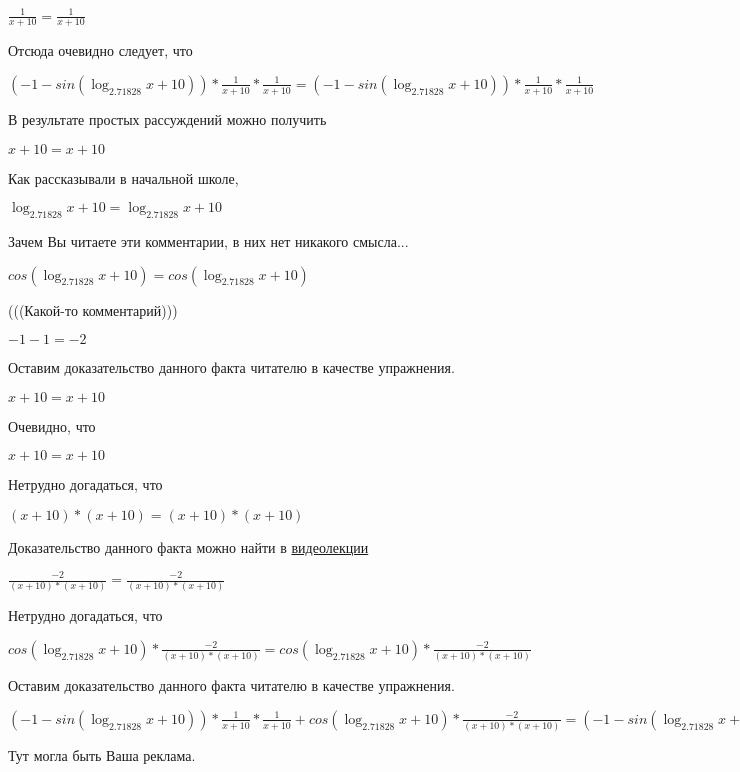 \documentclass[12pt,a4paper,fleqn]{article}
\theoremstyle{definition}
\begin{document}
$\frac{ 1 }{ x  +  10 }
 = \frac{ 1 }{ x  +  10 }
$

Отсюда очевидно следует, что

$( -1  - sin(\log_{ 2.71828 }{ x  +  10 })) * \frac{ 1 }{ x  +  10 }
 * \frac{ 1 }{ x  +  10 }
 = ( -1  - sin(\log_{ 2.71828 }{ x  +  10 })) * \frac{ 1 }{ x  +  10 }
 * \frac{ 1 }{ x  +  10 }
$

В результате простых рассуждений можно получить

$ x  +  10  =  x  +  10 $

Как рассказывали в начальной школе,

$\log_{ 2.71828 }{ x  +  10 } = \log_{ 2.71828 }{ x  +  10 }$

Зачем Вы читаете эти комментарии, в них нет никакого смысла...

$cos(\log_{ 2.71828 }{ x  +  10 }) = cos(\log_{ 2.71828 }{ x  +  10 })$

(((Какой-то комментарий)))

$ -1  -  1  =  -2 $

Оставим доказательство данного факта читателю в качестве упражнения.

$ x  +  10  =  x  +  10 $

Очевидно, что

$ x  +  10  =  x  +  10 $

Нетрудно догадаться, что

$( x  +  10 ) * ( x  +  10 ) = ( x  +  10 ) * ( x  +  10 )$

Доказательство данного факта можно найти в \href{https://www.youtube.com/watch?v=dQw4w9WgXcQ}{видеолекции}

$\frac{ -2 }{( x  +  10 ) * ( x  +  10 )}
 = \frac{ -2 }{( x  +  10 ) * ( x  +  10 )}
$

Нетрудно догадаться, что

$cos(\log_{ 2.71828 }{ x  +  10 }) * \frac{ -2 }{( x  +  10 ) * ( x  +  10 )}
 = cos(\log_{ 2.71828 }{ x  +  10 }) * \frac{ -2 }{( x  +  10 ) * ( x  +  10 )}
$

Оставим доказательство данного факта читателю в качестве упражнения.

$( -1  - sin(\log_{ 2.71828 }{ x  +  10 })) * \frac{ 1 }{ x  +  10 }
 * \frac{ 1 }{ x  +  10 }
 + cos(\log_{ 2.71828 }{ x  +  10 }) * \frac{ -2 }{( x  +  10 ) * ( x  +  10 )}
 = ( -1  - sin(\log_{ 2.71828 }{ x  +  10 })) * \frac{ 1 }{ x  +  10 }
 * \frac{ 1 }{ x  +  10 }
 + cos(\log_{ 2.71828 }{ x  +  10 }) * \frac{ -2 }{( x  +  10 ) * ( x  +  10 )}
$

Тут могла быть Ваша реклама.
\end{document}
